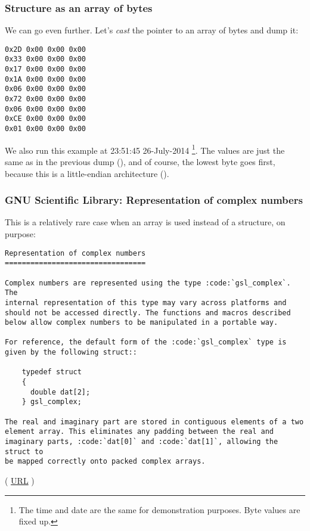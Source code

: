 \subsubsection{Structure as an array of bytes}

We can go even further. Let's \emph{cast} the pointer to an array of bytes and dump it:



\begin{lstlisting}
0x2D 0x00 0x00 0x00 
0x33 0x00 0x00 0x00 
0x17 0x00 0x00 0x00 
0x1A 0x00 0x00 0x00 
0x06 0x00 0x00 0x00 
0x72 0x00 0x00 0x00 
0x06 0x00 0x00 0x00 
0xCE 0x00 0x00 0x00 
0x01 0x00 0x00 0x00 
\end{lstlisting}

We also run this example at 23:51:45 26-July-2014
\footnote{The time and date are the same for demonstration purposes. Byte values are fixed up.}.
The values are just the same as in the previous dump 
(), and of course, the lowest byte goes first, because this is a little-endian architecture 
().



\subsubsection{GNU Scientific Library: Representation of complex numbers}

This is a relatively rare case when an array is used instead of a structure, on purpose:

\begin{lstlisting}
Representation of complex numbers
=================================

Complex numbers are represented using the type :code:`gsl_complex`. The
internal representation of this type may vary across platforms and
should not be accessed directly. The functions and macros described
below allow complex numbers to be manipulated in a portable way.

For reference, the default form of the :code:`gsl_complex` type is
given by the following struct::

    typedef struct
    {
      double dat[2];
    } gsl_complex;

The real and imaginary part are stored in contiguous elements of a two
element array. This eliminates any padding between the real and
imaginary parts, :code:`dat[0]` and :code:`dat[1]`, allowing the struct to
be mapped correctly onto packed complex arrays.
\end{lstlisting}
( \href{https://www.gnu.org/software/gsl/doc/html/complex.html#representation-of-complex-numbers}{URL} )

